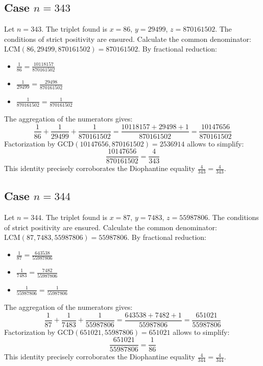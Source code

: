 \documentclass[11pt,a4paper]{article}
\begin{document}
\subsection{Case $n = 343$}
Let $n = 343$. The triplet found is $x = 86$, $y = 29499$, $z = 870161502$.
The conditions of strict positivity are ensured.
Calculate the common denominator: $\text{LCM}(86, 29499, 870161502) = 870161502$.
By fractional reduction:
\begin{itemize}
    \item $\frac{1}{86} = \frac{10118157}{870161502}$
    \item $\frac{1}{29499} = \frac{29498}{870161502}$
    \item $\frac{1}{870161502} = \frac{1}{870161502}$
\end{itemize}
The aggregation of the numerators gives:
$$ \frac{1}{86} + \frac{1}{29499} + \frac{1}{870161502} = \frac{10118157 + 29498 + 1}{870161502} = \frac{10147656}{870161502} $$
Factorization by $\text{GCD}(10147656, 870161502) = 2536914$ allows to simplify:
$$ \frac{10147656}{870161502} = \frac{4}{343} $$
This identity precisely corroborates the Diophantine equality $\frac{4}{343} = \frac{4}{343}$.

\subsection{Case $n = 344$}
Let $n = 344$. The triplet found is $x = 87$, $y = 7483$, $z = 55987806$.
The conditions of strict positivity are ensured.
Calculate the common denominator: $\text{LCM}(87, 7483, 55987806) = 55987806$.
By fractional reduction:
\begin{itemize}
    \item $\frac{1}{87} = \frac{643538}{55987806}$
    \item $\frac{1}{7483} = \frac{7482}{55987806}$
    \item $\frac{1}{55987806} = \frac{1}{55987806}$
\end{itemize}
The aggregation of the numerators gives:
$$ \frac{1}{87} + \frac{1}{7483} + \frac{1}{55987806} = \frac{643538 + 7482 + 1}{55987806} = \frac{651021}{55987806} $$
Factorization by $\text{GCD}(651021, 55987806) = 651021$ allows to simplify:
$$ \frac{651021}{55987806} = \frac{1}{86} $$
This identity precisely corroborates the Diophantine equality $\frac{4}{344} = \frac{4}{344}$.
\end{document}
